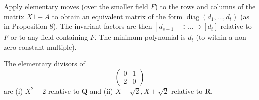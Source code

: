 Apply elementary moves (over the smaller field $F$) to the rows and columns of the matrix $X1 - A$ to obtain an equivalent matrix of the form $\operatorname{diag}(d_1, \ldots, d_t)$ (as in Proposition 8). The invariant factors are then $[d_{s+1}] \supset \ldots \supset [d_t]$ relative to $F$ or to any field containing $F$. The minimum polynomial is $d_t$ (to within a non-zero constant multiple).

The elementary divisors of
$$\begin{pmatrix} 0 & 1 \\ 2 & 0 \end{pmatrix}$$
are (i) $X^2 - 2$ relative to $\mathbf{Q}$ and (ii) $X - \sqrt{2}, X + \sqrt{2}$ relative to $\mathbf{R}$.
